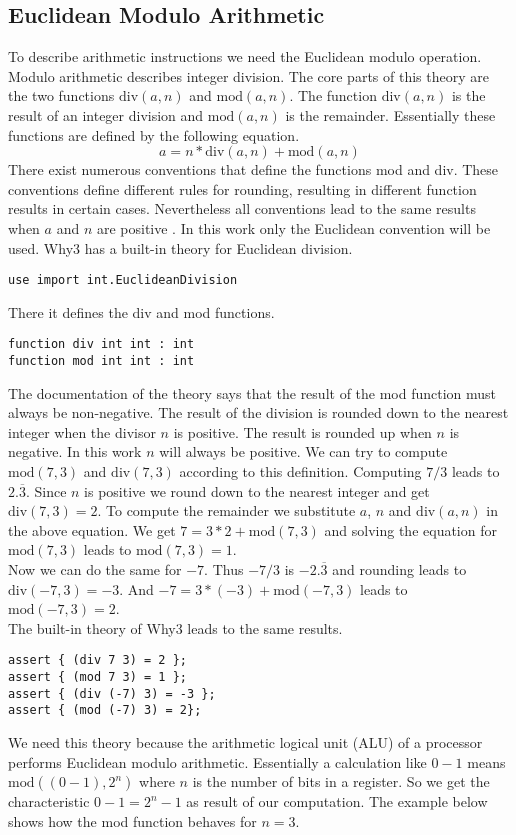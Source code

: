 \subsection{Euclidean Modulo Arithmetic}
To describe arithmetic instructions we need the Euclidean modulo operation.
Modulo arithmetic describes integer division. The core parts of this theory are
the two functions $\mathrm{div}(a,n)$ and $\mathrm{mod}(a, n)$. The function $\mathrm{div}(a,n)$ is the result
of an integer division and $\mathrm{mod}(a, n)$ is the remainder. Essentially these functions
are defined by the following equation.
\[ a = n * \mathrm{div}(a, n) + \mathrm{mod}(a, n)\]
There exist numerous conventions that define the functions mod and div. These conventions
define different rules for rounding, resulting in different function results in certain cases.
Nevertheless all conventions lead to the same results when $a$ and $n$ are positive \cite{eucmod}.
In this work only the Euclidean convention will be used. Why3 has a built-in theory 
for Euclidean division.
\begin{lstlisting}
use import int.EuclideanDivision
\end{lstlisting}
There it defines the div and mod functions.
\begin{lstlisting}
function div int int : int
function mod int int : int
\end{lstlisting}
The documentation of the theory says that the result of the mod function must always be non-negative. 
The result of the division is rounded down to the nearest integer when the divisor $n$ is positive.
The result is rounded up when $n$ is negative. In this work $n$ will always be positive. 
We can try to compute $\mathrm{mod}(7, 3)$ and $\mathrm{div}(7,3)$ according to this definition. Computing $7 / 3$ leads to
$2.\overline{3}$. Since $n$ is positive we round down to the nearest integer and get $\mathrm{div}(7, 3) = 2$. To compute the 
remainder we substitute $a$, $n$ and $\mathrm{div}(a, n)$ in the above equation. We get $7 = 3 * 2 + \mathrm{mod}(7, 3)$ 
and solving the equation for $\mathrm{mod}(7, 3)$ leads to $\mathrm{mod}(7, 3) = 1$. \\
Now we can do the same for $-7$. Thus $-7 / 3$ is $-2.\overline{3}$ and rounding leads to $\mathrm{div}(-7,3) = -3$. And
$-7 = 3 * (-3) + \mathrm{mod}(-7, 3)$ leads to $\mathrm{mod}(-7, 3) = 2$.\\
The built-in theory of Why3 leads to the same results.
\begin{lstlisting}
assert { (div 7 3) = 2 };
assert { (mod 7 3) = 1 };
assert { (div (-7) 3) = -3 };
assert { (mod (-7) 3) = 2};
\end{lstlisting}
We need this theory because the arithmetic logical unit (ALU) of a processor
performs Euclidean modulo arithmetic. Essentially a calculation like $ 0 - 1 $ means
$ \mathrm{mod}( (0 - 1), 2^{n} )$ where $n$ is the number of bits in a register.
So we get the characteristic $ 0 - 1 = 2^{n}-1 $ as result of our computation.
The example below shows how the mod function behaves for $n=3$.\vspace{0.2cm}


